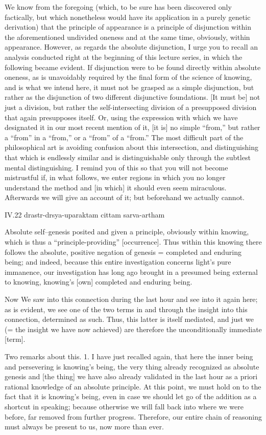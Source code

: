 We know from the foregoing
(which, to be sure has been discovered only factically,
but which nonetheless would have its application
in a purely genetic derivation)
that the principle of appearance is
a principle of disjunction
within the aforementioned undivided oneness
and at the same time, obviously, within appearance.
However, as regards the absolute disjunction,
I urge you to recall an analysis conducted right at
the beginning of this lecture series,
in which the following became evident.
If disjunction were to be found
directly within absolute oneness,
as is unavoidably required by
the final form of the science of knowing,
and is what we intend here,
it must not be grasped as a simple disjunction,
but rather as the disjunction of
two different disjunctive foundations.
[It must be] not just a division,
but rather the self-intersecting division
of a presupposed division that again presupposes itself.
Or, using the expression with which we have designated it
in our most recent mention of it,
[it is] no simple “from,”
but rather a “from” in a “from,”
or a “from” of a “from.”
The most difficult part of the philosophical art is
avoiding confusion about this intersection,
and distinguishing that which is endlessly similar
and is distinguishable only through the subtlest mental distinguishing.
I remind you of this so that you will not become mistrustful
if, in what follows, we enter regions
in which you no longer understand the method
and [in which] it should even seem miraculous.
Afterwards we will give an account of it;
but beforehand we actually cannot.

IV.22
drastr-drsya-uparaktam cittam sarva-artham

Absolute self–genesis posited and given a principle,
obviously within knowing,
which is thus a “principle-providing” [occurrence].
Thus within this knowing there follows
the absolute, positive negation of genesis =
completed and enduring being;
and indeed, because this entire investigation
concerns light’s pure immanence,
our investigation has long ago brought in
a presumed being external to knowing,
knowing’s [own] completed and enduring being.

Now We saw into this connection during the last hour
and see into it again here;
as is evident, we see one of the two terms
in and through the insight into this connection,
determined as such.
Thus, this latter is itself mediated,
and just we (= the insight we have now achieved) are
therefore the unconditionally immediate [term].

Two remarks about this.
1. I have just recalled again,
that here the inner being and persevering is knowing’s being,
the very thing already recognized as absolute genesis
and [the thing] we have also already validated in the last hour
as a priori rational knowledge of an absolute principle.
At this point, we must hold on to
the fact that it is knowing’s being,
even in case we should let go of
the addition as a shortcut in speaking;
because otherwise we will fall back into
where we were before, far removed from further progress.
Therefore, our entire chain of reasoning
must always be present to us, now more than ever.

